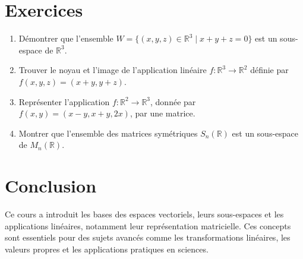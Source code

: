 \documentclass[12pt,a4paper]{article}
\begin{document}
\section*{Exercices}
\begin{enumerate}
    \item Démontrer que l'ensemble \( W = \{(x, y, z) \in \mathbb{R}^3 \mid x + y + z = 0\} \) est un sous-espace de \( \mathbb{R}^3 \).
    \item Trouver le noyau et l'image de l'application linéaire \( f : \mathbb{R}^3 \to \mathbb{R}^2 \) définie par \( f(x, y, z) = (x + y, y + z) \).
    \item Représenter l'application \( f : \mathbb{R}^2 \to \mathbb{R}^3 \), donnée par \( f(x, y) = (x - y, x + y, 2x) \), par une matrice.
    \item Montrer que l'ensemble des matrices symétriques \( S_n(\mathbb{R}) \) est un sous-espace de \( M_n(\mathbb{R}) \).
\end{enumerate}

\section*{Conclusion}
Ce cours a introduit les bases des espaces vectoriels, leurs sous-espaces et les applications linéaires, notamment leur représentation matricielle. Ces concepts sont essentiels pour des sujets avancés comme les transformations linéaires, les valeurs propres et les applications pratiques en sciences.
\end{document}

